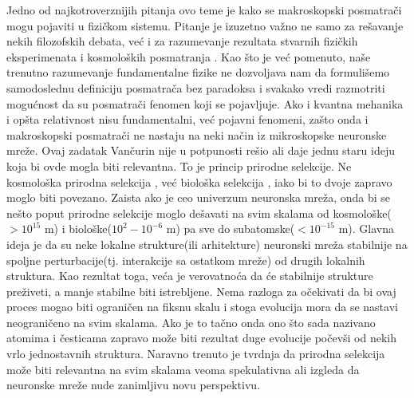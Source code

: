 \documentclass[a4paper]{article}
\begin{document}
Jedno od najkotroverznijih pitanja ovo teme je kako se makroskopski posmatrači mogu pojaviti u fizičkom sistemu. Pitanje je izuzetno važno ne samo za rešavanje nekih filozofskih debata, već i za razumevanje rezultata stvarnih fizičkih eksperimenata \cite{8} i kosmoloških posmatranja \cite{9}. Kao što je već pomenuto, naše trenutno razumevanje fundamentalne fizike ne dozvoljava nam da formulišemo samodoslednu definiciju posmatrača bez paradoksa i svakako vredi razmotriti mogućnost da su posmatrači fenomen koji se pojavljuje. Ako i kvantna mehanika i opšta relativnost nisu fundamentalni, već pojavni fenomeni, zašto onda i makroskopski posmatrači ne nastaju na neki način iz mikroskopske neuronske mreže. Ovaj zadatak Vančurin nije u potpunosti rešio ali daje jednu staru ideju koja bi ovde mogla biti relevantna. To je princip prirodne selekcije. Ne kosmološka prirodna selekcija \cite{10}, već biološka selekcija \cite{11}, iako bi to dvoje zapravo moglo biti povezano. Zaista ako je ceo univerzum neuronska mreža, onda bi se nešto poput prirodne selekcije moglo dešavati na svim skalama od kosmološke($>10^{15}$ m) i biološke($10^{2}-10^{-6}$ m) pa sve do subatomske($<10^{-15}$ m). Glavna ideja je da su neke lokalne strukture(ili arhitekture) neuronski mreža stabilnije na spoljne perturbacije(tj. interakcije sa ostatkom mreže) od drugih lokalnih struktura. Kao rezultat toga, veća je verovatnoća da će stabilnije strukture preživeti, a manje stabilne biti istrebljene. Nema razloga za očekivati da bi ovaj proces mogao biti ograničen na fiksnu skalu i stoga evolucija mora da se nastavi neograničeno na svim skalama. Ako je to tačno onda ono što sada nazivano atomima i česticama zapravo može biti rezultat duge evolucije počevši od nekih vrlo jednostavnih struktura. Naravno trenuto je tvrdnja da prirodna selekcija može biti relevantna na svim skalama veoma spekulativna ali izgleda da neuronske mreže nude zanimljivu novu perspektivu.

\printbibliography[
heading=bibintoc,
title={Literatura}
]
\end{document}
